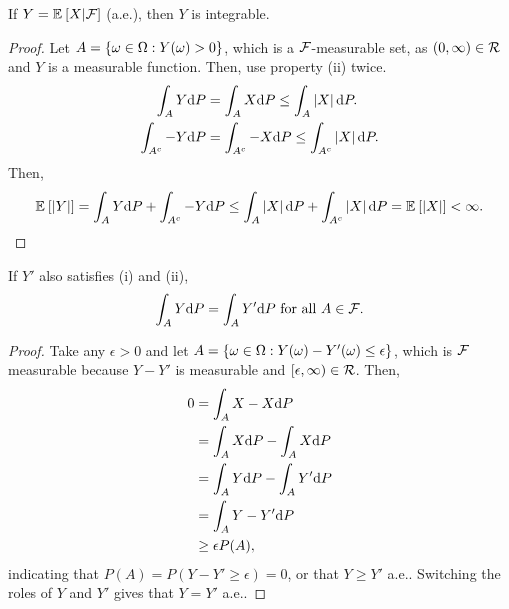 \begin{lem}[Integrability]
    If $Y = {\mathbb E}_{}\left[X | \mathcal{F}\right]$ (a.e.), then $Y$ is integrable.
\end{lem}
\begin{proof}
    Let $A = \left\{\omega \in \Omega: Y(\omega) > 0\right\}$, which is a $\mathcal{F}$-measurable set, as $(0, \infty) \in \mathcal{R}$ and $Y$ is a measurable function. Then, use property (ii) twice.
    \begin{align*}
        \int_A Y \text{d} P &= \int_A X \text{d} P \leq \int_A \left|X\right| \text{d} P.\\
        \int_{A^c} -Y \text{d} P &= \int_{A^c} -X \text{d} P \leq \int_{A^c} \left|X\right| \text{d} P.
    \end{align*} 
    Then,
    \begin{align*}
        {\mathbb E}_{}\left[\left|Y\right|\right] = \int_A Y \text{d} P + \int_{A^c} -Y \text{d} P \leq \int_A \left|X\right| \text{d} P + \int_{A^c} \left|X\right| \text{d} P = {\mathbb E}_{}\left[\left|X\right|\right] < \infty.
    \end{align*}
\end{proof}

\begin{lem}[Uniqueness]
    If $Y'$ also satisfies (i) and (ii),
    \begin{align*}
        \int_A Y \text{d} P = \int_A Y' \text{d} P \text{ for all } A \in \mathcal{F}.
    \end{align*}
\end{lem}
\begin{proof}
    Take any $\epsilon > 0$ and let $A = \left\{\omega \in \Omega: Y(\omega) - Y'(\omega) \leq \epsilon\right\}$, which is $\mathcal{F}$ measurable because $Y - Y'$ is measurable and $[\epsilon, \infty) \in \mathcal{R}$. Then,
    \begin{align*}
        0 &= \int_A X - X \text{d} P\\
        &= \int_A X \text{d} P - \int_A X \text{d} P\\
        &= \int_A Y \text{d} P - \int_A Y' \text{d} P\\
        &= \int_A Y -Y' \text{d} P\\
        &\geq \epsilon P(A),
    \end{align*}
    indicating that $P(A) = P(Y - Y' \geq \epsilon) = 0$, or that $Y \geq Y'$ a.e.. Switching the roles of $Y$ and $Y'$ gives that $Y = Y'$ a.e.. 
\end{proof}

